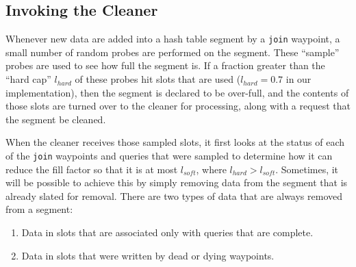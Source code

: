 \documentclass{sig-alternate}
\renewcommand\:{\colon} %
\begin{document}
\subsection{Invoking the Cleaner}

Whenever new data are added into a hash table segment by a \texttt{join} waypoint, a small number of random probes are performed on the segment.
These ``sample'' probes are used to see how full the segment is.  If a fraction greater than the
``hard cap'' $l_{hard}$ of these probes hit slots that
are used ($l_{hard} = 0.7$ in our implementation), then the segment is declared to be over-full,
and the contents of those slots are turned over to the cleaner 
for processing, along with a request that the segment be cleaned.

When the cleaner receives those sampled slots, it first looks at the status of each of the \texttt{join} waypoints and queries that were sampled
to determine how it can reduce the fill factor so that it is at most $l_{soft}$, where $l_{hard} > l_{soft}$.
Sometimes, it will be possible to achieve this by simply removing data from the segment that is already slated for removal.
There are two types of data that are always removed from a segment:

\begin{enumerate}

\item
Data in slots that are associated only with queries that are complete.

\item Data in slots that were written by dead or dying waypoints.

\end{enumerate}
\end{document}

